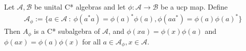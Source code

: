 

\begin{theorem}
  Let $\mathcal{A, B}$ be unital C* algebras and let $\phi:
  \mathcal{A} \to \mathcal{B}$ be a ucp map. Define
  \begin{align*}
    \mathcal{A}_\phi := \{ a \in \mathcal{A} \ : \ \phi(a^*a) =
    \phi(a)^*\phi(a), \phi(aa^*) = \phi(a) \phi(a)^* \}
  \end{align*}
  Then $A_\phi$ is a C* subalgebra of $\mathcal{A}$, and $  \phi(xa)
  = \phi(x) \phi(a)$ and $\phi(ax) = \phi(a) \phi(x)$ for all $a \in
  \mathcal{A}_\phi, x \in \mathcal{A}$.
\end{theorem}
